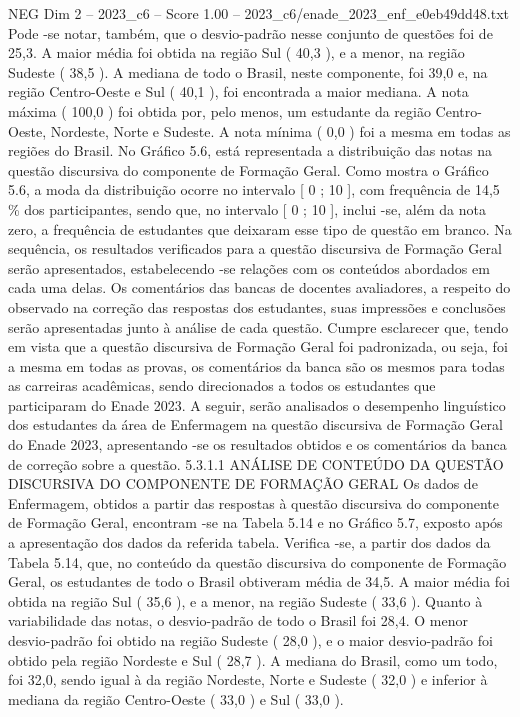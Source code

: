 \begin{textsample}{NEG Dim 2 – 2023\_c6 – Score 1.00 – 2023\_c6/enade\_2023\_enf\_e0eb49dd48.txt}
Pode -se notar, também, que o desvio-padrão nesse conjunto de questões foi de 25,3.
A maior média foi obtida na região Sul ( 40,3 ), e a menor, na região Sudeste ( 38,5 ).
A mediana de todo o Brasil, neste componente, foi 39,0 e, na região Centro-Oeste e Sul ( 40,1 ), foi encontrada a maior mediana.
A nota máxima ( 100,0 ) foi obtida por, pelo menos, um estudante da região Centro-Oeste, Nordeste, Norte e Sudeste.
A nota mínima ( 0,0 ) foi a mesma em todas as regiões do Brasil.
No Gráfico 5.6, está representada a distribuição das notas na questão discursiva do componente de Formação Geral.
Como mostra o Gráfico 5.6, a moda da distribuição ocorre no intervalo [ 0 ; 10 ], com frequência de 14,5 \% dos participantes, sendo que, no intervalo [ 0 ; 10 ], inclui -se, além da nota zero, a frequência de estudantes que deixaram esse tipo de questão em branco.
Na sequência, os resultados verificados para a questão discursiva de Formação Geral serão apresentados, estabelecendo -se relações com os conteúdos abordados em cada uma delas.
Os comentários das bancas de docentes avaliadores, a respeito do observado na correção das respostas dos estudantes, suas impressões e conclusões serão apresentadas junto à análise de cada questão.
Cumpre esclarecer que, tendo em vista que a questão discursiva de Formação Geral foi padronizada, ou seja, foi a mesma em todas as provas, os comentários da banca são os mesmos para todas as carreiras acadêmicas, sendo direcionados a todos os estudantes que participaram do Enade 2023.
A seguir, serão analisados o desempenho linguístico dos estudantes da área de Enfermagem na questão discursiva de Formação Geral do Enade 2023, apresentando -se os resultados obtidos e os comentários da banca de correção sobre a questão. 5.3.1.1 ANÁLISE DE CONTEÚDO DA QUESTÃO DISCURSIVA DO COMPONENTE DE FORMAÇÃO GERAL Os dados de Enfermagem, obtidos a partir das respostas à questão discursiva do componente de Formação Geral, encontram -se na Tabela 5.14 e no Gráfico 5.7, exposto após a apresentação dos dados da referida tabela.
Verifica -se, a partir dos dados da Tabela 5.14, que, no conteúdo da questão discursiva do componente de Formação Geral, os estudantes de todo o Brasil obtiveram média de 34,5.
A maior média foi obtida na região Sul ( 35,6 ), e a menor, na região Sudeste ( 33,6 ).
Quanto à variabilidade das notas, o desvio-padrão de todo o Brasil foi 28,4.
O menor desvio-padrão foi obtido na região Sudeste ( 28,0 ), e o maior desvio-padrão foi obtido pela região Nordeste e Sul ( 28,7 ).
A mediana do Brasil, como um todo, foi 32,0, sendo igual à da região Nordeste, Norte e Sudeste ( 32,0 ) e inferior à mediana da região Centro-Oeste ( 33,0 ) e Sul ( 33,0 ).

\end{textsample}
